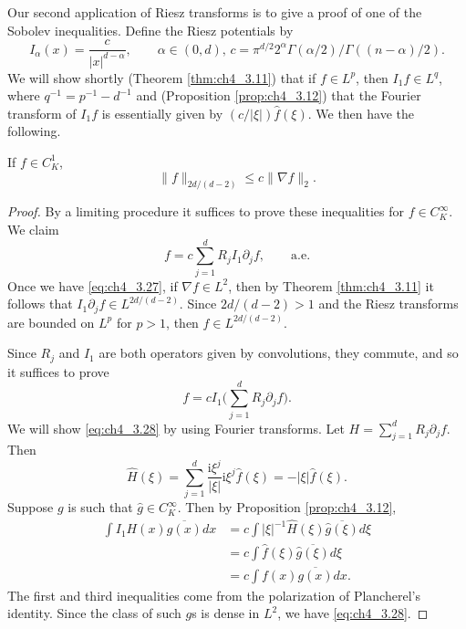 
Our second application of Riesz transforms is to give a proof of one of the Sobolev inequalities. Define the Riesz potentials by
\[
    I_\alpha(x) = \frac{c}{|x|^{d-\alpha}}, \qquad \alpha \in (0,d), \, c = \pi^{d/2}2^\alpha\Gamma(\alpha/2)/\Gamma((n-\alpha)/2).
\]
\mnewpage
We will show shortly (Theorem \ref{thm:ch4_3.11}) that if $f \in L^p$, then $I_1 f \in L^q$, where $q^{-1} = p^{-1} - d^{-1}$ and (Proposition \ref{prop:ch4_3.12}) that the Fourier transform of $I_1 f$ is essentially given by $(c/|\xi|)\widehat{f}(\xi)$. We then have the following.

\begin{theorem}[Sobolev]\label{thm:ch4_3.10}
If $f \in C_K^1$,
\[
    \|f\|_{2d/(d-2)} \leq c\|\nabla f\|_2.
\]
\end{theorem}

\begin{proof}
By a limiting procedure it suffices to prove these inequalities for $f \in C_K^\infty$. We claim
\begin{equation}\label{eq:ch4_3.27}
    f = c\sum_{j=1}^d R_j I_1 \partial_j f, \qquad \text{a.e.}
\end{equation}
Once we have \eqref{eq:ch4_3.27}, if $\nabla f \in L^2$, then by Theorem \ref{thm:ch4_3.11} it follows that $I_1 \partial_j f \in L^{2d/(d-2)}$. Since $2d/(d-2)>1$ and the Riesz transforms are bounded on $L^p$ for $p > 1$, then $f \in L^{2d/(d-2)}$.

Since $R_j$ and $I_1$ are both operators given by convolutions, they commute, and so it suffices to prove
\begin{equation}\label{eq:ch4_3.28}
    f = cI_1\Big(\sum_{j=1}^d R_j\partial_j f\Big).
\end{equation}
We will show \eqref{eq:ch4_3.28} by using Fourier transforms. Let $H = \sum_{j=1}^d R_j\partial_j f$. Then
\[
    \widehat{H}(\xi) = \sum_{j=1}^d \frac{\text{i}\xi^j}{|\xi|}\text{i}\xi^j\widehat{f}(\xi) = -|\xi|\widehat{f}(\xi).
\]
Suppose $g$ is such that $\widehat{g} \in C_K^\infty$. Then by Proposition \ref{prop:ch4_3.12},
\begin{align*}
    \int I_1 H(x)\overline{g(x)}dx &= c\int|\xi|^{-1}\widehat{H}(\xi)\overline{\widehat{g}(\xi)}d\xi \\
    &= c\int \widehat{f}(\xi)\overline{\widehat{g}(\xi)}d\xi \\
    &= c\int f(x)\overline{g(x)}dx.
\end{align*}
The first and third inequalities come from the polarization of Plancherel's identity. Since the class of such $g$s is dense in $L^2$, we have \eqref{eq:ch4_3.28}.
\end{proof}

